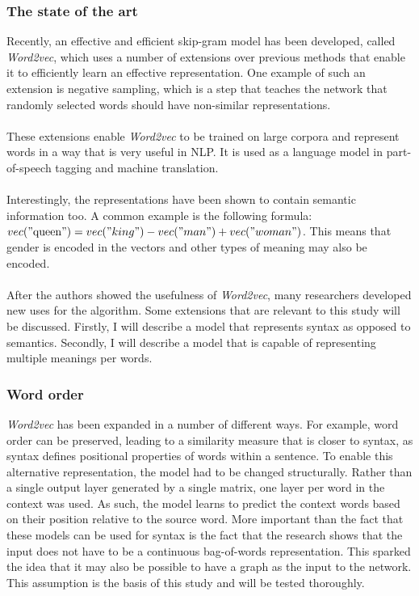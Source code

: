 \documentclass{article}
\begin{document}
 \subsubsection{The state of the art}
 Recently, an effective and efficient skip-gram model has been developed, called \emph{Word2vec}, which uses a number of extensions over previous methods that enable it to efficiently learn an effective representation\cite{w2v}. One example of such an extension is negative sampling, which is a step that teaches the network that randomly selected words should have non-similar representations.
 \paragraph{}
 These extensions enable \emph{Word2vec} to be trained on large corpora and represent words in a way that is very useful in NLP. It is used as a language model in part-of-speech tagging and machine translation.
 \paragraph{}
 Interestingly, the representations have been shown to contain semantic information too. A common example is the following formula: $vec("\text{queen}") = vec("king") - vec("man") + vec("woman")$. This means that gender is encoded in the vectors and other types of meaning may also be encoded.
 \paragraph{}
 After the authors showed the usefulness of \emph{Word2vec}, many researchers developed new uses for the algorithm. Some extensions that are relevant to this study will be discussed. Firstly, I will describe a model that represents syntax as opposed to semantics. Secondly, I will describe a model that is capable of representing multiple meanings per words.
 
 \subsubsection{Word order} \label{wordorder}
 \emph{Word2vec} has been expanded in a number of different ways. For example, word order can be preserved, leading to a similarity measure that is closer to syntax, as syntax defines positional properties of words within a sentence\cite{ling2015}. To enable this alternative representation, the model had to be changed structurally. Rather than a single output layer generated by a single matrix, one layer per word in the context was used. As such, the model learns to predict the context words based on their position relative to the source word. More important than the fact that these models can be used for syntax is the fact that the research shows that the input does not have to be a continuous bag-of-words representation. This sparked the idea that it may also be possible to have a graph as the input to the network. This assumption is the basis of this study and will be tested thoroughly.
 
\end{document}
